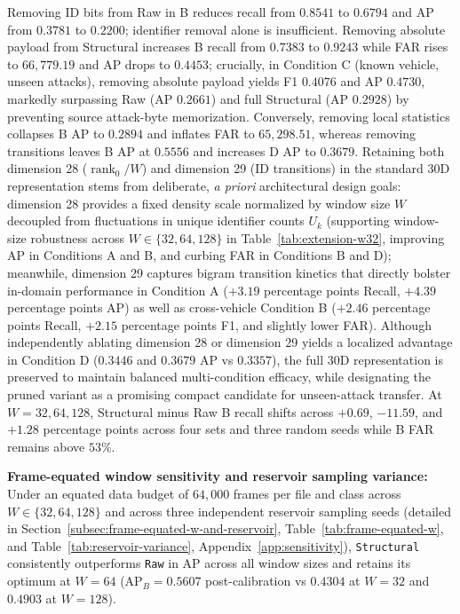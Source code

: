 \documentclass[12pt, a4paper, reqno, oneside]{book}
\DeclareRobustCommand{\code}[1]{\nolinkurl{#1}}
\begin{document}
Removing ID bits from Raw in B reduces recall from $0.8541$ to $0.6794$ and AP from $0.3781$ to $0.2200$; identifier removal alone is insufficient. Removing absolute payload from Structural increases B recall from $0.7383$ to $0.9243$ while FAR rises to $66,779.19$ and AP drops to $0.4453$; crucially, in Condition C (known vehicle, unseen attacks), removing absolute payload yields F1 $0.4076$ and AP $0.4730$, markedly surpassing Raw (AP $0.2661$) and full Structural (AP $0.2928$) by preventing source attack-byte memorization. Conversely, removing local statistics collapses B AP to $0.2894$ and inflates FAR to $65,298.51$, whereas removing transitions leaves B AP at $0.5556$ and increases D AP to $0.3679$. Retaining both dimension 28 ($\operatorname{rank}_0/W$) and dimension 29 (ID transitions) in the standard 30D representation stems from deliberate, \textit{a priori} architectural design goals: dimension 28 provides a fixed density scale normalized by window size $W$ decoupled from fluctuations in unique identifier counts $U_k$ (supporting window-size robustness across $W \in \{32, 64, 128\}$ in Table~\ref{tab:extension-w32}, improving AP in Conditions A and B, and curbing FAR in Conditions B and D); meanwhile, dimension 29 captures bigram transition kinetics that directly bolster in-domain performance in Condition A ($+3.19$ percentage points Recall, $+4.39$ percentage points AP) as well as cross-vehicle Condition B ($+2.46$ percentage points Recall, $+2.15$ percentage points F1, and slightly lower FAR). Although independently ablating dimension 28 or dimension 29 yields a localized advantage in Condition D ($0.3446$ and $0.3679$ AP vs $0.3357$), the full 30D representation is preserved to maintain balanced multi-condition efficacy, while designating the pruned variant as a promising compact candidate for unseen-attack transfer. At $W=32, 64, 128$, Structural minus Raw B recall shifts across $+0.69$, $-11.59$, and $+1.28$ percentage points across four sets and three random seeds while B FAR remains above $53\%$.

\noindent\textbf{Frame-equated window sensitivity and reservoir sampling variance:} Under an equated data budget of $64,000$ frames per file and class across $W \in \{32, 64, 128\}$ and across three independent reservoir sampling seeds (detailed in Section~\ref{subsec:frame-equated-w-and-reservoir}, Table~\ref{tab:frame-equated-w}, and Table~\ref{tab:reservoir-variance}, Appendix~\ref{app:sensitivity}), \code{Structural} consistently outperforms \code{Raw} in AP across all window sizes and retains its optimum at $W=64$ ($\text{AP}_B=0.5607$ post-calibration vs $0.4304$ at $W=32$ and $0.4903$ at $W=128$).
\end{document}
